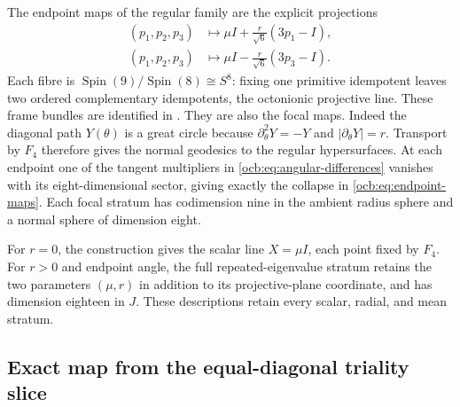 \documentclass[11pt]{article}
\theoremstyle{definition}
\begin{document}
The endpoint maps of the regular family are the explicit projections
\begin{equation}
 \begin{aligned}
 (p_1,p_2,p_3)&\longmapsto
             \mu I+\tfrac r{\sqrt6}(3p_1-I),\\
 (p_1,p_2,p_3)&\longmapsto
             \mu I-\tfrac r{\sqrt6}(3p_3-I).
 \end{aligned}
 \label{ocb:eq:endpoint-maps}\tag{OCB35}
\end{equation}
Each fibre is $\operatorname{Spin}(9)/\operatorname{Spin}(8)\cong S^8$:
fixing one primitive idempotent leaves two ordered complementary
idempotents, the octonionic projective line. These frame bundles
are identified in \cite[Sections~2.3--2.6]{MareWillems2013}.
They are also the focal maps. Indeed the diagonal path $Y(\theta)$
is a great circle because $\partial_\theta^2Y=-Y$ and
$|\partial_\theta Y|=r$. Transport by $F_4$ therefore gives the
normal geodesics to the regular hypersurfaces. At each endpoint one
of the tangent multipliers in \eqref{ocb:eq:angular-differences}
vanishes with its eight-dimensional sector, giving exactly the
collapse in \eqref{ocb:eq:endpoint-maps}. Each focal stratum has
codimension nine in the ambient radius sphere and a normal sphere
of dimension eight.

For $r=0$, the construction gives the scalar line $X=\mu I$,
each point fixed by $F_4$. For $r>0$ and endpoint angle, the full
repeated-eigenvalue stratum retains the two parameters $(\mu,r)$
in addition to its projective-plane coordinate, and has dimension
eighteen in $J$. These descriptions retain every scalar, radial,
and mean stratum.

\subsection{Exact map from the equal-diagonal triality slice}
\label{ocb:sec:triality-slice}
\end{document}
